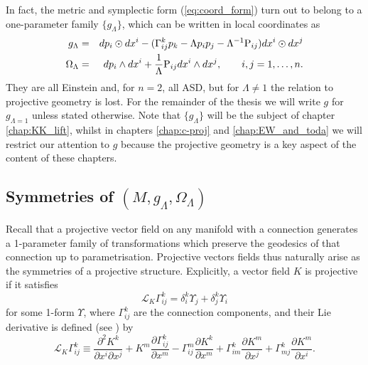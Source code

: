 In fact, the metric and symplectic form (\ref{eq:coord_form}) turn
out to belong to a one-parameter family $\{g_{\Lambda}\}$, which
can be written in local coordinates as 
\begin{eqnarray}
g_{\Lambda} & = &  dp_{i}\odot dx^{i}-(\Gamma_{ij}^{k}p_{k}-\Lambda p_{i}p_{j}-\Lambda^{-1}\mathrm{P}_{ij}) dx^{i}\odot dx^{j}\label{eq:general_g}\\
\Omega_{\Lambda} & = &  dp_{i}\wedge dx^{i}+\frac{1}{\Lambda}\mathrm{P}_{ij} dx^{i}\wedge dx^{j},\qquad i,j=1,\dots ,n.\label{eq:general_omega}
\end{eqnarray}
They are all Einstein and, for $n=2$, all ASD, but for $\Lambda\neq1$ the relation to projective geometry is lost. For the remainder of the thesis we will write $g$ for $g_{\Lambda=1}$ unless stated otherwise. Note that $\{g_\Lambda\}$ will be the subject of chapter \ref{chap:KK_lift}, whilst in chapters \ref{chap:c-proj} and \ref{chap:EW_and_toda} we will restrict our attention to $g$ because the projective geometry is a key aspect of the content of these chapters.


\subsection{Symmetries of $(M,g_{\Lambda},\Omega_{\Lambda})$}

Recall that a projective vector field on any manifold with a connection
generates a 1-parameter family of transformations which preserve the
geodesics of that connection up to parametrisation. Projective vectors
fields thus naturally arise as the symmetries of a projective structure.
Explicitly, a vector field $K$ is projective if it satisfies
\begin{equation}
\mathcal{L}_{K}\Gamma_{ij}^{k}=\delta_{i}^{k}\Upsilon_{j}+\delta_{j}^{k}\Upsilon_{i}\label{eq:proj_transf}
\end{equation}
for some 1-form $\Upsilon$, where $\Gamma_{ij}^{k}$ are the connection
components, and their Lie derivative is defined (see \cite{Yano1955})
by
\begin{equation}
\mathcal{L}_{K}\Gamma_{ij}^{k}\equiv\frac{\partial^{2}K^{k}}{\partial x^{i}\partial x^{j}}+K^{m}\frac{\partial\Gamma_{ij}^{k}}{\partial x^{m}}-\Gamma_{ij}^{m}\frac{\partial K^{k}}{\partial x^{m}}+\Gamma_{im}^{k}\frac{\partial K^{m}}{\partial x^{j}}+\Gamma_{mj}^{k}\frac{\partial K^{m}}{\partial x^{i}}.\label{eq:liederivGamma}
\end{equation}


